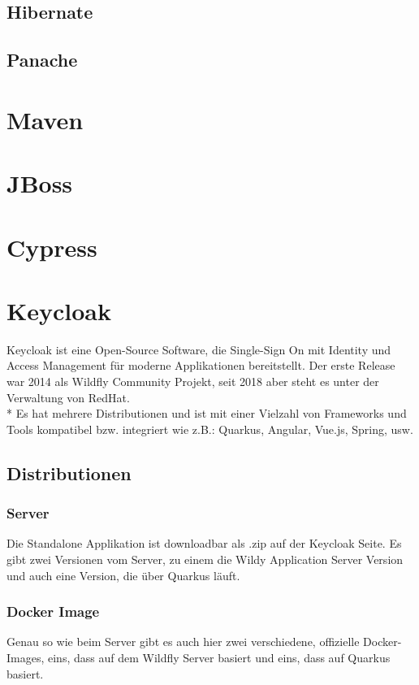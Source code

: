 \subsection{Hibernate}

\subsection{Panache}

\section{Maven}

\section{JBoss}

\section{Cypress}

\section{Keycloak}
\author{Benjamin Besic}
Keycloak ist eine Open-Source Software, die Single-Sign On mit Identity und Access Management für moderne Applikationen bereitstellt. Der erste Release war 2014 als Wildfly Community Projekt, seit 2018 aber steht es unter der Verwaltung von RedHat. \cite{KeycloakWiki}  \\* 
Es hat mehrere Distributionen und ist mit einer Vielzahl von Frameworks und Tools kompatibel bzw. integriert wie z.B.: Quarkus, Angular, Vue.js, Spring, usw. \cite{KeyCloakDZone}

\subsection{Distributionen}
\subsubsection{Server}
Die Standalone Applikation ist downloadbar als .zip auf der Keycloak Seite. Es gibt zwei Versionen vom Server, zu einem die Wildy Application Server Version und auch eine Version, die über Quarkus läuft.
\subsubsection{Docker Image}
Genau so wie beim Server gibt es auch hier zwei verschiedene, offizielle Docker-Images, eins, dass auf dem Wildfly Server basiert und eins, dass auf Quarkus basiert.
